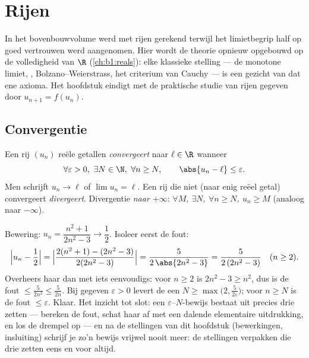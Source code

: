 \chapter{Rijen}\label{ch:b1:seq}

In het bovenbouwvolume werd met rijen gerekend terwijl het limietbegrip
half op goed vertrouwen werd aangenomen. Hier wordt de theorie opnieuw
opgebouwd op de volledigheid van $\R$ (\cref{ch:b1:reals}): elke
klassieke stelling --- de monotone limiet, ,
Bolzano--Weierstrass, het criterium van Cauchy --- is een gezicht van dat
ene axioma. Het hoofdstuk eindigt met de praktische studie van rijen
gegeven door $u_{n+1} = f(u_n)$.

\section{Convergentie}

\begin{definition}\label{def:b1:seq:limit}
Een rij $(u_n)$ reële getallen \emph{convergeert} naar $\ell \in \R$
wanneer
\[
\forall \varepsilon > 0,\ \exists N \in \N,\ \forall n \geq N,
\qquad \abs{u_n - \ell} \leq \varepsilon .
\]
Men schrijft $u_n \to \ell$ of $\lim u_n = \ell$. Een rij die niet (naar
enig reëel getal) convergeert \emph{divergeert}. Divergentie \emph{naar
$+\infty$}: $\forall M,\ \exists N,\ \forall n \geq N,\ u_n \geq M$
(analoog naar $-\infty$).
\end{definition}

\begin{example}\label{ex:b1:seq:epsilonN}
Bewering: $u_n = \dfrac{n^2 + 1}{2n^2 - 3} \to \dfrac12$. Isoleer eerst
de fout:
\[
\Bigl| u_n - \frac12 \Bigr|
= \Bigl| \frac{2(n^2 + 1) - (2n^2 - 3)}{2(2n^2 - 3)} \Bigr|
= \frac{5}{2\,\abs{2n^2 - 3}}
= \frac{5}{2\,(2n^2 - 3)} \quad (n \geq 2).
\]
Overheers haar dan met iets eenvoudigs: voor $n \geq 2$ is $2n^2 - 3 \geq
n^2$, dus is de fout $\leq \frac{5}{2n^2} \leq \frac 5{2n}$. Bij gegeven
$\varepsilon > 0$ levert de  een $N \geq
\max\bigl(2, \frac{5}{2\varepsilon}\bigr)$; voor $n \geq N$ is de fout
$\leq \varepsilon$. Klaar. Het inzicht tot slot: een
$\varepsilon$--$N$-bewijs bestaat uit precies drie zetten --- bereken de
fout, schat haar af met een dalende elementaire uitdrukking, en los de
drempel op --- en na de stellingen van dit hoofdstuk (bewerkingen,
insluiting) schrijf je zo'n bewijs vrijwel nooit meer: de stellingen
verpakken die drie zetten eens en voor altijd.
\end{example}


